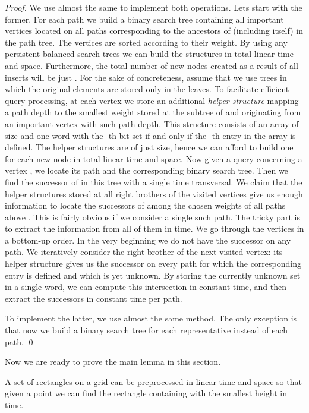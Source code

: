 \documentclass[runningheads]{llncs}
\begin{document}
\begin{proof}
We use almost the same to implement both operations. Lets start with the former. For each path  we build a binary search tree containing all important vertices located on all paths corresponding to the ancestors of  (including  itself) in the path tree. The vertices are sorted according to their weight. By using any persistent balanced search trees we can build the structures in total linear time and space. Furthermore, the total number of new nodes created as a result of all inserts will be just . For the sake of concreteness, assume that we use trees in which the original elements are stored only in the leaves. To facilitate efficient query processing, at each vertex  we store an additional \emph{helper structure} mapping a path depth to the smallest weight stored at the subtree of  and originating from an important vertex with such path depth. This structure consists of an array of size  and one word with the -th bit set if and only if the -th entry in the array is defined. The helper structures are of just  size, hence we can afford to build one for each new node in total linear time and space. Now given a query concerning a vertex , we locate its path and the corresponding binary search tree. Then we find the successor of  in this tree with a single  time transversal. We claim that the helper structures stored at all right brothers of the visited vertices give us enough information to locate the successors of  among the chosen weights of all paths above . This is fairly obvious if we consider a single such path. The tricky part is to extract the information from all of them in  time. We go through the vertices in a bottom-up order. In the very beginning we do not have the successor on any path. We iteratively consider the right brother of the next visited vertex: its helper structure gives us the successor on every path for which the corresponding entry is defined and which is yet unknown. By storing the currently unknown set in a single word, we can compute this intersection in constant time, and then extract the successors in constant time per path.

To implement the latter, we use almost the same method. The only exception is that now we build a binary search tree for each representative instead of each path.
\qed
\end{proof}

Now we are ready to prove the main lemma in this section.

\begin{lemma}\label{lemma:smallest}
A set of  rectangles on a  grid can be preprocessed in linear time and space so that given a point  we can find the rectangle  containing  with the smallest height  in  time.
\end{lemma}
\end{document}
